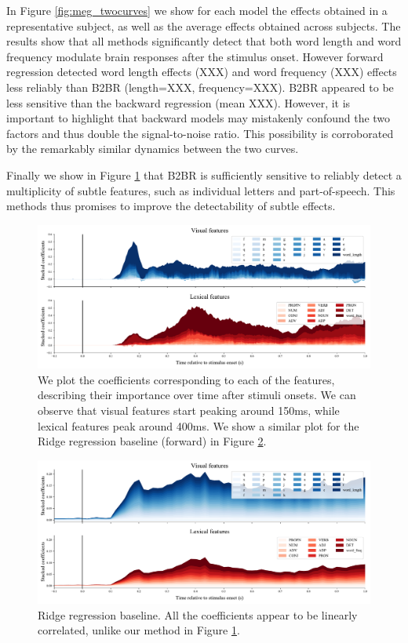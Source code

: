 In Figure \ref{fig:meg_twocurves} we show for each model the effects obtained in a
representative subject, as well as the average effects obtained across subjects.
The results show that all methods significantly detect that both word length and
word frequency modulate brain responses after the stimulus onset. However
forward regression detected word length effects (XXX) and word frequency (XXX)
effects less reliably than B2BR (length=XXX, frequency=XXX). B2BR appeared to
be less sensitive than the backward regression (mean XXX). However, it is
important to highlight that backward models may mistakenly confound the two
factors and thus double the signal-to-noise ratio. This possibility is
corroborated by the remarkably similar dynamics between the two curves.

Finally we show in Figure \ref{fig:megresult} that B2BR is sufficiently sensitive
to reliably detect a multiplicity of subtle features, such as individual letters
and part-of-speech. This methods thus promises to improve the detectability of
subtle effects.

\begin{figure}
  \centering
  \includegraphics[width=\textwidth, trim=0cm 0cm 0cm 0cm, clip=True]{figures/meg_result.pdf}
  \caption{We plot the coefficients corresponding to each of the features,
  describing their importance over time after stimuli onsets. We can observe that visual features start peaking around 150ms, while lexical features peak around 400ms. We show a similar plot for the Ridge regression baseline (forward) in Figure \ref{fig:ridgebaselineresult}.}
  \label{fig:megresult}
\end{figure}

\begin{figure}
  \centering
  \includegraphics[width=\textwidth, trim=0cm 0cm 0cm 0cm, clip=True]{figures/ridgecv_baseline_result.pdf}
  \caption{Ridge regression baseline. All the coefficients appear to be
  linearly correlated, unlike our method in Figure \ref{fig:megresult}.}
  \label{fig:ridgebaselineresult}
\end{figure}
